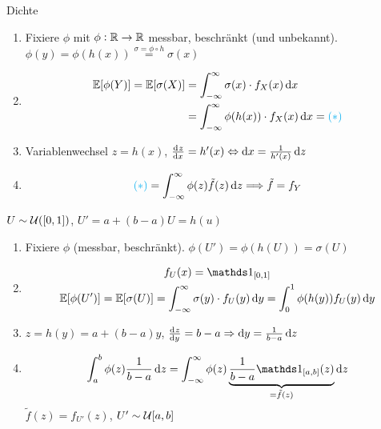 \begin{recipe}{Dichte}
	\begin{enumerate}
		\item Fixiere $\phi$ mit $\phi: \mathbb{R} \rightarrow \mathbb{R}$ messbar, beschränkt (und unbekannt). $\phi (y) = \phi (h(x))
			\overset{\sigma = \phi \circ h}{=} \sigma(x)$
			\item \begin{align*}
					\E [ \phi (Y) ] =  \E [ \sigma (X) ] &= \int_{- \infty}^{\infty} \sigma(x) \cdot f_X (x)
					\dif x \\
					& = \int_{- \infty}^{\infty} \phi (h(x)) \cdot f_X (x) \dif x = \textcolor{lightblue}{(*)}
			\end{align*}
		\item Variablenwechsel $z = h(x)$, $\od{z}{x} = h'(x) \Leftrightarrow \dif x = \frac{1}{h'(x)} \dif z$
			\item \begin{equation*}
					\textcolor{lightblue}{(*)} = \int_{-\infty}^{\infty} \phi(z) \tilde{f} (z) \dif z \Longrightarrow
					\tilde{f} = f_Y
			\end{equation*}
	\end{enumerate}
\end{recipe}
\begin{example}
	$U \sim \mathcal{U}([0,1])$, $U' = a + (b-a) U = h(u)$
	\begin{enumerate}
		\item Fixiere $\phi$ (messbar, beschränkt). $\phi(U') = \phi(h(U)) = \sigma (U)$
		\item 
			\begin{gather*}
				f_U (x) = \indf[{[0,1]}]\\
				\E [\phi(U')] = \E [\sigma(U)] = \int_{-\infty}^{\infty} \sigma(y) \cdot f_U (y) \dif y = \int_{0}^{1} \phi
				(h(y)) f_U (y) \dif y
			\end{gather*}
		\item $z = h(y) = a + (b -a ) y$, $\od{z}{y} = b - a \Rightarrow \dif y = \frac{1}{b-a} \dif z$
		\item \begin{equation*}
				\int_{a}^{b} \phi(z) \frac{1}{b-a} \dif z = \int_{- \infty}^{\infty} \phi(z) \underbrace{\frac{1}{b-a}
				\indf[{[a,b]}] (z)}_{= \tilde{f} (z)} \dif z
		\end{equation*}
		$ \tilde{f}(z) = f_{U'}(z)$, $U' \sim \mathcal{U} [a,b]$
	\end{enumerate}
\end{example}

